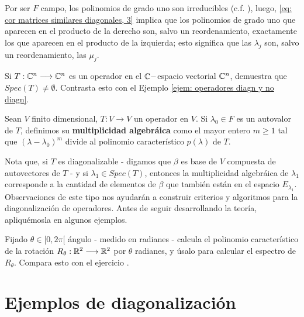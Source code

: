 Por ser $F$ campo, los polinomios de grado uno son irreducibles
(c.f. \cite{Rotman}), luego, \eqref{eq: cor matrices similares diagonales, 3}
implica que los polinomios de grado uno que aparecen en el producto de la 
derecho son, salvo un reordenamiento, exactamente los que aparecen en el 
producto de la izquierda; esto significa que 
las $\lambda_{j}$ son, salvo un reordenamiento, las $\mu_{j}$.
\QEDB
\vspace{0.2cm}

 Si $T : \mathbb{C}^{n} \longrightarrow \mathbb{C}^{n}$
es un operador en el $\mathbb{C}-$espacio vectorial $\mathbb{C}^{n}$, demuestra
que $Spec(T) \neq \emptyset$. Contrasta esto con  
el Ejemplo \ref{ejem: operadores diagn y no diagn}.

\begin{defi}
	\label{def: multiplicidad de un autovector}
	Sean $V$ finito dimensional, $T: V \longrightarrow V$ un operador en $V$.
	Si $\lambda_{0} \in F$ es un autovalor de $T$, definimos su \textbf{multiplicidad
	algebráica} como el mayor entero $m \geq 1$ tal que 
	$(\lambda - \lambda_{0})^{m}$ divide al polinomio 
	característico $p(\lambda)$ de $T$.
\end{defi}


Nota que, si $T$ es diagonalizable - 
digamos que $\beta$ es base de $V$ compuesta de autovectores de $T$ -
y si $\lambda_{1} \in Spec(T)$, entonces
la multiplicidad algebráica de $\lambda_{1}$ corresponde a la
cantidad de elementos de $\beta$ que también están en el 
espacio $E_{\lambda_{1}}$. Observaciones de este tipo nos ayudarán
a construir criterios y algoritmos para la diagonalización de operadores.
Antes de seguir desarrollando la teoría, apliquémosla en algunos ejemplos.

 Fijado $\theta \in [0, 2\pi[$ ángulo - medido en 
radianes - calcula el polinomio característico de la rotación 
$R_{\theta} : \mathbb{R}^{2} \longrightarrow \mathbb{R}^{2}$ por $\theta$
radianes, y úsalo para calcular el espectro de $R_{\theta}$.
Compara esto con el ejercicio .

\section{Ejemplos de diagonalización}

